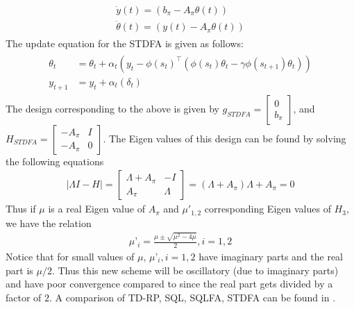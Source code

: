 \begin{align}
\begin{split}
\dot{y}(t)=(b_\pi-A_\pi\theta(t))\\
\dot{\theta}(t)=(y(t)-A_\pi\theta(t))
\end{split}
\end{align}
The update equation for the STDFA is given as follows:
\begin{align}
\begin{split}
\theta_t&=\theta_t+\alpha_t(y_t-\phi(s_t)^\top(\phi(s_t)\theta_t-\gamma \phi(s_{t+1})\theta_t))\\
y_{t+1}&=y_{t}+\alpha_t(\delta_t)
\end{split}
\end{align}
The design corresponding to the above is given by $g_{STDFA}=\begin{bmatrix}0\\ b_\pi\end{bmatrix}$, and $H_{STDFA}=\begin{bmatrix} -A_\pi & I \\ -A_\pi & 0\end{bmatrix}$. The Eigen values of this design can be found by solving the following equations
\begin{align}
|\Lambda I-H|=\begin{bmatrix} \Lambda+A_\pi & -I \\ A_\pi & \Lambda\end{bmatrix}=(\Lambda+A_\pi)\Lambda+A_\pi=0
\end{align}
Thus if $\mu$ is a real Eigen value of $A_\pi$ and $\mu'_{1,2}$ corresponding Eigen values of $H_3$, we have the relation
\begin{align}
\mu’_{i}=\frac{\mu\pm\sqrt{\mu^2-4\mu}}{2}, i=1,2
\end{align}
Notice that for small values of $\mu$, $\mu’_i, i=1,2$ have imaginary parts and the real part is $\mu/2$. Thus this new scheme will be oscillatory (due to imaginary parts) and have poor convergence compared to \tdo since the real part gets divided by a factor of $2$. A comparison of TD-RP, SQL, SQLFA, STDFA can be found in \Cref{}. 

